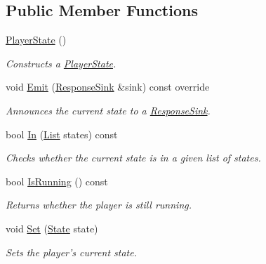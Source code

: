 \subsection*{Public Member Functions}
\begin{DoxyCompactItemize}
\item 
\hypertarget{classPlayerState_a6d3de3f57e9db4ec34e5a7403fc03868}{\hyperlink{classPlayerState_a6d3de3f57e9db4ec34e5a7403fc03868}{Player\+State} ()}\label{classPlayerState_a6d3de3f57e9db4ec34e5a7403fc03868}

\begin{DoxyCompactList}\small\item\em Constructs a \hyperlink{classPlayerState}{Player\+State}. \end{DoxyCompactList}\item 
void \hyperlink{classPlayerState_aa93a9879688bfbd3d89ac102c079cbfd}{Emit} (\hyperlink{classResponseSink}{Response\+Sink} \&sink) const override
\begin{DoxyCompactList}\small\item\em Announces the current state to a \hyperlink{classResponseSink}{Response\+Sink}. \end{DoxyCompactList}\item 
bool \hyperlink{classPlayerState_aa2c0e603dd57dcc37759d716596ffa33}{In} (\hyperlink{classPlayerState_a0f4e455f0579f97740855ccc6177c9f1}{List} states) const 
\begin{DoxyCompactList}\small\item\em Checks whether the current state is in a given list of states. \end{DoxyCompactList}\item 
bool \hyperlink{classPlayerState_aeb19817b9da2f6765b990983f87e1527}{Is\+Running} () const 
\begin{DoxyCompactList}\small\item\em Returns whether the player is still running. \end{DoxyCompactList}\item 
void \hyperlink{classPlayerState_a822999cf7d4cf72ba77f218906bb8aaa}{Set} (\hyperlink{classPlayerState_ab013f68ff23d69d677faae624b5dff07}{State} state)
\begin{DoxyCompactList}\small\item\em Sets the player's current state. \end{DoxyCompactList}\end{DoxyCompactItemize}

